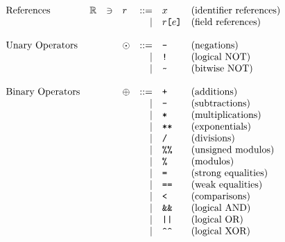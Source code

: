 \[
  \begin{array}{lrclrll}
    \text{References} & \refset &\ni& \refvalue &
    ::= & \id                                                   & \text{(identifier references)}\\
    &&&&\mid& \refvalue \C{[} \expr \C{]}                       & \text{(field references)}\\
    \\
    \text{Unary Operators} &&& \uop &
    ::= & \C{-}                                                 & \text{(negations)}\\
    &&&&\mid& \C{!}                                             & \text{(logical NOT)}\\
    &&&&\mid& \C{\char`~}                                       & \text{(bitwise NOT)}\\
    \\
    \text{Binary Operators} &&& \bop &
    ::= & \C{+}                                                 & \text{(additions)}\\
    &&&&\mid& \C{-}                                             & \text{(subtractions)}\\
    &&&&\mid& \C{*}                                             & \text{(multiplications)}\\
    &&&&\mid& \C{**}                                            & \text{(exponentials)}\\
    &&&&\mid& \C{/}                                             & \text{(divisions)}\\
    &&&&\mid& \C{\%\%}                                          & \text{(unsigned modulos)}\\
    &&&&\mid& \C{\%}                                            & \text{(modulos)}\\
    &&&&\mid& \C{=}                                             & \text{(strong equalities)}\\
    &&&&\mid& \C{==}                                            & \text{(weak equalities)}\\
    &&&&\mid& \C{<}                                             & \text{(comparisons)}\\
    &&&&\mid& \C{\&\&}                                          & \text{(logical AND)}\\
    &&&&\mid& \C{||}                                            & \text{(logical OR)}\\
    &&&&\mid& \C{\char`^\char`^}                                & \text{(logical XOR)}\\

\end{array}\]
